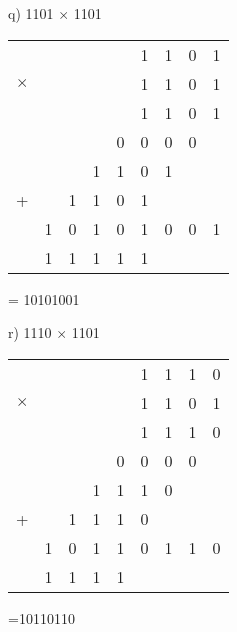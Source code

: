 \begin{figure}[H]
    \begin{minipage}[t]{0.45\textwidth}
        q) 1101 $\times$ 1101
        \begin{table}[H]
            \centering
            \begin{tabularx}{0.8\linewidth}{rXXXXXXXX}
                &  &  &  &  & 1 & 1 & 0 & 1 \\
                $\times$&  &  &  &  & 1 & 1 & 0 & 1 \\
                \cline{6-9}
                &  &  &  &  & 1 & 1 & 0 & 1 \\
                &  &  &  & 0 & 0 & 0 & 0 &  \\
                &  &  & 1 & 1 & 0 & 1 &  &  \\
                +&  & 1 & 1 & 0 & 1 &  &  &  \\
                \cline{2-9}
                & 1 & 0 & 1 & 0 & 1 & 0 & 0 & 1 \\
                \cline{2-9}
                & 1 & 1 & 1 & 1 & 1 &  &  &  \\
            \end{tabularx}
        \end{table}
        = 10101001
    \end{minipage}\hfill
    \begin{minipage}[t]{0.45\textwidth}
        r) 1110 $\times$ 1101
        \begin{table}[H]
            \centering
            \begin{tabularx}{0.8\linewidth}{rXXXXXXXX}
                &  &  &  &  & 1 & 1 & 1 & 0 \\
                $\times$&  &  &  &  & 1 & 1 & 0 & 1 \\
                \cline{6-9}
                &  &  &  &  & 1 & 1 & 1 & 0 \\
                &  &  &  & 0 & 0 & 0 & 0 &  \\
                &  &  & 1 & 1 & 1 & 0 &  &  \\
                +&  & 1 & 1 & 1 & 0 &  &  &  \\
                \cline{2-9}
                & 1 & 0 & 1 & 1 & 0 & 1 & 1 & 0 \\
                \cline{2-9}
                & 1 & 1 & 1 & 1 &  &  &  &  \\
            \end{tabularx}
        \end{table}
        =10110110
    \end{minipage}\hfill
\end{figure}


